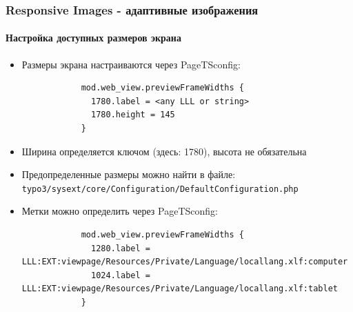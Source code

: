 
\begin{frame}[fragile]
	\frametitle{Responsive Images - адаптивные изображения}
	\framesubtitle{Настройка доступных размеров экрана}

	\begin{itemize}
		\item Размеры экрана настраиваются через PageTSconfig:


		\begin{lstlisting}
			mod.web_view.previewFrameWidths {
			  1780.label = <any LLL or string>
			  1780.height = 145
			}
		\end{lstlisting}

		\item Ширина определяется ключом (здесь: 1780), высота не обязательна
		\item Предопределенные размеры можно найти в файле:\newline
			\small\texttt{typo3/sysext/core/Configuration/DefaultConfiguration.php}\normalsize
		\item Метки можно определить через PageTSconfig:

		\begin{lstlisting}
			mod.web_view.previewFrameWidths {
			  1280.label = LLL:EXT:viewpage/Resources/Private/Language/locallang.xlf:computer
			  1024.label = LLL:EXT:viewpage/Resources/Private/Language/locallang.xlf:tablet
			}
		\end{lstlisting}

	\end{itemize}

\end{frame}


